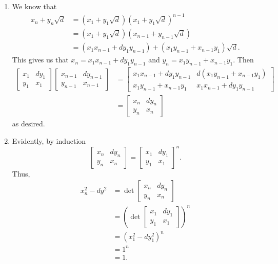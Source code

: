 \documentclass[12 pt, letterpaper]{hmcpset}
\begin{document}
\begin{solution}
	\begin{enumerate}
		\item We know that 
			\[
				\begin{split}
					x_{n} + y_{n} \sqrt{d} & =  (x_{1} + y_{1} \sqrt{d}) (x_{1} + y_{1} \sqrt{d})^{n - 1} \\
							       & = (x_{1} + y_{1} \sqrt{d})(x_{n - 1} + y_{n - 1} \sqrt{d}) \\
							       & = (x_{1} x_{n - 1} + d y_{1} y_{n - 1}) + (x_{1} y_{n - 1} + x_{n - 1} y_{1}) \sqrt{d}.
				\end{split}
			\]
			This gives us that $x_{n} = x_{1} x_{n - 1} + d y_{1} y_{n - 1}$ and $y_{n} = x_{1} y_{n - 1} + x_{n - 1} y_{1}$. Then
			\[
				\begin{split}
					\begin{bmatrix}
						x_{1} & d y_{1} \\
						y_{1} & x_{1}
					\end{bmatrix} 
					\begin{bmatrix}
					x_{n - 1} & d y_{n - 1} \\
					y_{n - 1} & x_{n - 1}
				\end{bmatrix} & = \begin{bmatrix}
				x_{1} x_{n - 1} + d y_{1} y_{n - 1} & d (x_{1} y_{n - 1} + x_{n - 1} y_{1}) \\
				x_{1} y_{n - 1} + x_{n - 1} y_{1} & x_{1} x_{n - 1} + d y_{1} y_{n - 1}
				\end{bmatrix} \\
				& = \begin{bmatrix}
					x_{n} & d y_{n} \\
					y_{n} & x_{n}
				\end{bmatrix}
				\end{split}
			\]
			as desired.
		\item
			Evidently, by induction
			\[
				\begin{bmatrix}
					x_{n} & d y_{n} \\
					y_{n} & x_{n}
				\end{bmatrix} = \begin{bmatrix}
					x_{1} & d y_{1} \\
					y_{1} & x_{1}
				\end{bmatrix}^{n}.
			\]
			Thus,
			\[
				\begin{split}
					x_{n}^{2} - d y^{2} & = \det \begin{bmatrix}
						x_{n} & d y_{n} \\
						y_{n} & x_{n}
					\end{bmatrix} \\
							    & = \left ( \det \begin{bmatrix}
						x_{1} & d y_{1} \\
						y_{1} & x_{1}
					\end{bmatrix} \right )^{n} \\
							    & = (x_{1}^{2} - d y_{1}^{2})^{n} \\
							    & = 1^{n} \\
							    & = 1.
				\end{split}
			\]
	\end{enumerate}
\end{solution}
\end{document}

